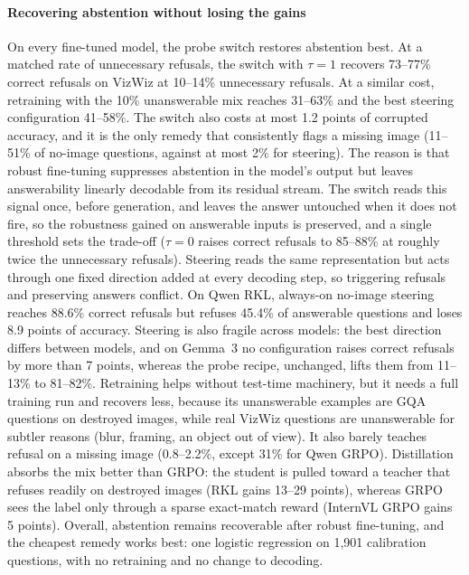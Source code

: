 \documentclass[10pt,twocolumn,letterpaper]{article}
\begin{document}
\paragraph{Recovering abstention without losing the gains}
\label{sec:rq3}

On every fine-tuned model, the probe switch restores abstention best. At a matched rate of
unnecessary refusals, the switch with $\tau{=}1$ recovers 73--77\% correct refusals on VizWiz
at 10--14\% unnecessary refusals. At a similar cost, retraining with the 10\% unanswerable mix
reaches 31--63\% and the best steering configuration 41--58\%. The switch also costs at most
1.2 points of corrupted accuracy, and it is the only remedy that consistently flags a missing
image (11--51\% of no-image questions, against at most 2\% for steering). The reason is that
robust fine-tuning suppresses abstention in the model's output but leaves answerability
linearly decodable from its residual stream. The switch reads this signal once, before
generation, and leaves the answer untouched when it does not fire, so the robustness gained on
answerable inputs is preserved, and a single threshold sets the trade-off ($\tau{=}0$ raises
correct refusals to 85--88\% at roughly twice the unnecessary refusals). Steering reads the
same representation but acts through one fixed direction added at every decoding step, so
triggering refusals and preserving answers conflict. On Qwen RKL, always-on no-image steering
reaches 88.6\% correct refusals but refuses 45.4\% of answerable questions and loses 8.9
points of accuracy. Steering is also fragile across models: the best direction differs between
models, and on Gemma~3 no configuration raises correct refusals by more than 7 points, whereas
the probe recipe, unchanged, lifts them from 11--13\% to 81--82\%. Retraining helps without
test-time machinery, but it needs a full training run and recovers less, because its
unanswerable examples are GQA questions on destroyed images, while real VizWiz questions are
unanswerable for subtler reasons (blur, framing, an object out of view). It also barely
teaches refusal on a missing image (0.8--2.2\%, except 31\% for Qwen GRPO). Distillation
absorbs the mix better than GRPO: the student is pulled toward a teacher that refuses readily
on destroyed images (RKL gains 13--29 points), whereas GRPO sees the label only through a
sparse exact-match reward (InternVL GRPO gains 5 points). Overall, abstention remains
recoverable after robust fine-tuning, and the cheapest remedy works best: one logistic
regression on 1{,}901 calibration questions, with no retraining and no change to decoding.
\end{document}
